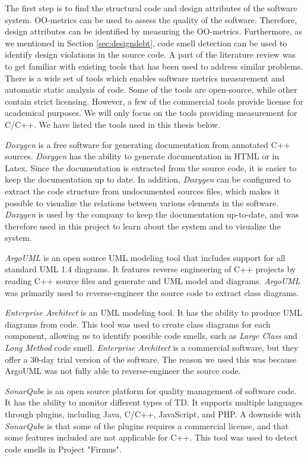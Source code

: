 The first step is to find the structural code and design attributes of the software system. OO-metrics can be used to assess the quality of the software. Therefore, design attributes can be identified by measuring the OO-metrics. Furthermore, as we mentioned in Section \ref{sec:designdebt}, code smell detection can be used to identify design violations in the source code. A part of the literature review was to get familiar with existing tools that has been used to address similar problems. There is a wide set of tools which enables software metrics measurement and automatic static analysis of code. Some of the tools are open-source, while other contain strict licensing. However, a few of the commercial tools provide license for academical purposes. We will only focus on the tools providing measurement for C/C++. We have listed the tools used in this thesis below.

\textit{Doxygen}\cite{doxygen} is a free software for generating documentation from annotated C++ sources. \textit{Doxygen} has the ability to generate documentation in HTML or in Latex. Since the documentation is extracted from the source code, it is easier to keep the documentation up to date. In addition, \textit{Doxygen} can be configured to extract the code structure from undocumented sources files, which makes it possible to visualize the relations between various elements in the software. \textit{Doxygen} is used by the company to keep the documentation up-to-date, and was therefore used in this project to learn about the system and to visualize the system. 

\textit{ArgoUML}\cite{argouml} is an open source UML modeling tool that includes support for all standard UML 1.4 diagrams. It features reverse engineering of C++ projects by reading C++ source files and generate and UML model and diagrams. \textit{ArgoUML} was primarily used to reverse-engineer the source code to extract class diagrams.

\textit{Enterprise Architect}\cite{enterprisearchi} is an UML modeling tool. It has the ability to produce UML diagrams from code. This tool was used to create class diagrams for each component, allowing us to identify possible code smells, such as \textit{Large Class} and \textit{Long Method} code smell. \textit{Enterprise Architect} is a commercial software, but they offer a 30-day trial version of the software. The reason we used this was because ArgoUML was not fully able to reverse-engineer the source code.

\textit{SonarQube}\cite{sonarsource2013sonarqube} is an open source platform for quality management of software code. It has the ability to monitor different types of TD. It supports multiple languages through plugins, including Java, C/C++, JavaScript, and PHP. A downside with \textit{SonarQube} is that some of the plugins requires a commercial license, and that some features included are not applicable for C++. This tool was used to detect code smells in Project "Firmus".

